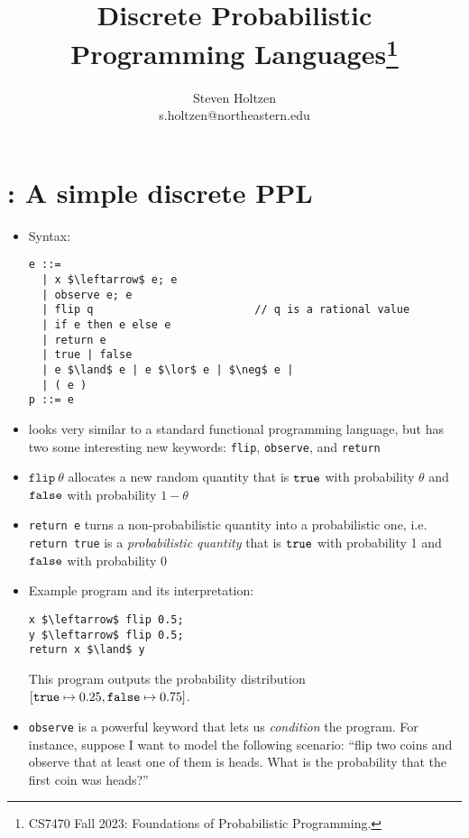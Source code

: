 \documentclass{tufte-handout}
\title{Discrete Probabilistic Programming Languages\thanks{CS7470 Fall 2023: Foundations of Probabilistic Programming.}}
\author[]{Steven Holtzen\\s.holtzen@northeastern.edu}
\begin{document}
\maketitle%

\section{\disc{}: A simple discrete PPL}

\begin{itemize}
  \item Syntax:
\begin{lstlisting}[mathescape=true]
  e ::=
  | x $\leftarrow$ e; e
  | observe e; e
  | flip q                         // q is a rational value
  | if e then e else e
  | return e
  | true | false
  | e $\land$ e | e $\lor$ e | $\neg$ e |
  | ( e )
p ::= e
\end{lstlisting}

\item \disc{} looks very similar to a standard functional programming language,
but has two some interesting new keywords: \texttt{flip}, \texttt{observe}, and
\texttt{return}

\item $\texttt{flip}~\theta$ allocates a new random quantity that is $\texttt{true}$
with probability $\theta$ and $\texttt{false}$ with probability $1-\theta$

\item \texttt{return e} turns a non-probabilistic quantity into a probabilistic one, i.e. 
\texttt{return true} is a \emph{probabilistic quantity} that is $\texttt{true}$ with probability 1 and 
$\texttt{false}$ with probability 0

\item Example program and its interpretation: 

\begin{lstlisting}[mathescape=true]
x $\leftarrow$ flip 0.5; 
y $\leftarrow$ flip 0.5;
return x $\land$ y
\end{lstlisting}

This program outputs the probability distribution $[\texttt{true} \mapsto 0.25, \texttt{false}
\mapsto 0.75]$.

\item \texttt{observe} is a powerful keyword that lets us \emph{condition} the
program. For instance, suppose I want to model the following scenario: ``flip 
two coins and observe that at least one of them is heads. What is the probability 
that the first coin was heads?''


\end{itemize}
\end{document}
